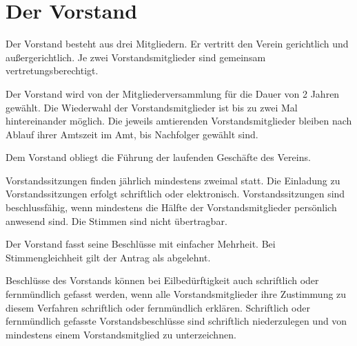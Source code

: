 \documentclass[a5paper, ngerman, 10pt]{scrreprt}
\begin{document}
\section{Der Vorstand}
\begin{compactenum}[(1)]
    \item Der Vorstand besteht aus drei Mitgliedern. Er vertritt den Verein
        gerichtlich und außergerichtlich. Je zwei Vorstandsmitglieder sind
        gemeinsam vertretungsberechtigt.
    \item Der Vorstand wird von der Mitgliederversammlung für die Dauer von 2
        Jahren gewählt. Die Wiederwahl der Vorstandsmitglieder ist bis zu zwei
        Mal hintereinander möglich. Die jeweils amtierenden Vorstandsmitglieder
        bleiben nach Ablauf ihrer Amtszeit im Amt, bis Nachfolger gewählt sind.
    \item Dem Vorstand obliegt die Führung der laufenden Geschäfte des Vereins.
    \item Vorstandssitzungen finden jährlich mindestens zweimal statt. Die
        Einladung zu Vorstandssitzungen erfolgt schriftlich oder elektronisch.
        Vorstandssitzungen sind beschlussfähig, wenn mindestens die Hälfte der
        Vorstandsmitglieder persönlich anwesend sind. Die Stimmen sind nicht
        übertragbar.
    \item Der Vorstand fasst seine Beschlüsse mit einfacher Mehrheit. Bei
        Stimmengleichheit gilt der Antrag als abgelehnt.
    \item Beschlüsse des Vorstands können bei Eilbedürftigkeit auch schriftlich
        oder fernmündlich gefasst werden, wenn alle Vorstandsmitglieder ihre
        Zustimmung zu diesem Verfahren schriftlich oder fernmündlich erklären.
        Schriftlich oder fernmündlich gefasste Vorstandsbeschlüsse sind
        schriftlich niederzulegen und von mindestens einem Vorstandsmitglied zu
        unterzeichnen.
\end{compactenum}
\end{document}
